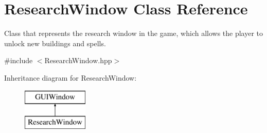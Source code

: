 \hypertarget{class_research_window}{}\section{Research\+Window Class Reference}
\label{class_research_window}


Class that represents the research window in the game, which allows the player to unlock new buildings and spells.  




{\ttfamily \#include $<$Research\+Window.\+hpp$>$}

Inheritance diagram for Research\+Window\+:\begin{figure}[H]
\begin{center}
\leavevmode
\includegraphics[height=2.000000cm]{class_research_window}
\end{center}
\end{figure}
